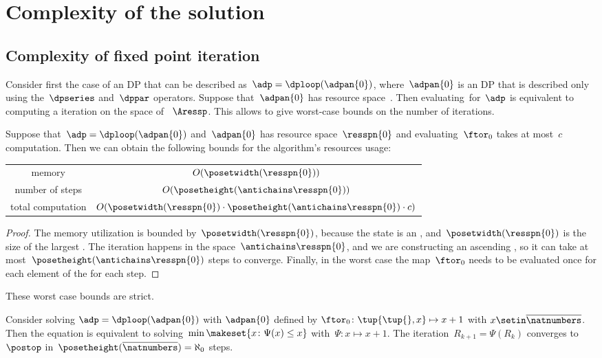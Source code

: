 
\section{Complexity of the solution}

\subsection{Complexity of fixed point iteration}

Consider first the case of an DP that can be described as~$\adp=\dploop(\adpan{0})$, where~$\adpan{0}$ is an DP that is described only using the~$\dpseries$ and~$\dppar$ operators.
Suppose that~$\adpan{0}$ has resource space~\ressp.
Then evaluating~\ftor for~$\adp$ is equivalent to computing a  iteration on the space of ~$\Aressp$.
This allows to give worst-case bounds on the number of iterations.

\begin{proposition}
    \label{prop:complexity}
    Suppose that~$\adp=\dploop(\adpan{0})$ and~$\adpan{0}$ has resource space~$\resspn{0}$ and evaluating~$\ftor_{0}$ takes at most~$c$ computation.
    Then we can obtain the following bounds for the algorithm's resources usage:

    \smallskip{}
    \begin{tabular}{cc}
        memory            & $O(\posetwidth(\resspn{0}))$\tabularnewline
        number of steps   & $O(\posetheight(\antichains\resspn{0}))$\tabularnewline
        total computation & $O(\posetwidth(\resspn{0})\cdot\posetheight(\antichains\resspn{0})\cdot c)$\tabularnewline
    \end{tabular}

\end{proposition}
\begin{proof}
    The memory utilization is bounded by~$\posetwidth(\resspn{0})$, because the state is an , and~$\posetwidth(\resspn{0})$ is the size of the largest .
    The iteration happens in the space~$\antichains\resspn{0}$, and we are constructing an ascending , so it can take at most~$\posetheight(\antichains\resspn{0})$ steps to converge.
    Finally, in the worst case the map~$\ftor_{0}$ needs to be evaluated once for each element of the  for each step.
\end{proof}
These worst case bounds are strict.
\begin{example}
    Consider solving $\adp=\dploop(\adpan{0})$ with $\adpan{0}$ defined by $\ftor_{0}\colon\tup{ \tup{ },x} \mapsto x+1$ with $x\setin\overline{\natnumbers}$.
    Then the  equation is equivalent to solving~$\min\makeset{x\colon\Psi(x)\leq x}$ with~$\Psi:x\mapsto x+1$.
    The iteration~$R_{k+1}=\Psi(R_{k})$ converges to~$\postop$ in~$\posetheight(\overline{\natnumbers})=\aleph_{0}$ steps.
\end{example}

